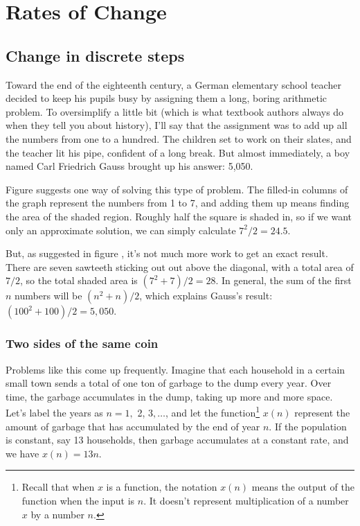 \chapter{Rates of Change}\label{ch:rates-of-change}

\section{Change in discrete steps}

Toward the end of the eighteenth century, a German elementary school teacher
decided to keep his pupils busy by assigning them a long, boring arithmetic
problem. To oversimplify a little bit (which is what textbook authors always do when
they tell you about history), I'll say that the assignment was to add up all the numbers
from one to a hundred. The children set to work on their slates, and the teacher
lit his pipe, confident of a long break. But almost immediately, a boy named
Carl Friedrich Gauss brought up his answer: 5,050.\label{gauss-story}
%
%

Figure  suggests one way of solving this type of problem.
The filled-in columns of the graph represent the numbers from 1 to 7, and
adding them up means finding the area of the shaded region. Roughly half the
square is shaded in, so if we want only an approximate solution, we can
simply calculate $7^2/2=24.5$.

But, as suggested in figure , it's not much more work to
get an exact result. There are seven sawteeth sticking out out above the diagonal,
with a total area of $7/2$, so the total shaded area is $(7^2+7)/2=28$.
In general, the sum of the first $n$ numbers will be $(n^2+n)/2$, which explains
Gauss's result: $(100^2+100)/2=5,050$.
%
%
\subsection{Two sides of the same coin}

Problems like this come up frequently. Imagine that each household in a certain
small town sends a total of one ton of garbage to the dump every year. Over
time, the garbage accumulates in the dump, taking up more and more space.
Let's label the years as $n=1,$ 2, $3,\ldots$, and let the
function\footnote{Recall that when $x$ is a function, the notation $x(n)$ means
the output of the function when the input is $n$. It doesn't represent
multiplication of a number $x$ by a number $n$.}
$x(n)$ represent the amount of garbage that has accumulated by the end
of year $n$.
If the population is constant, say 13 households, then
garbage accumulates at a constant rate, and we have $x(n)=13n$. 

